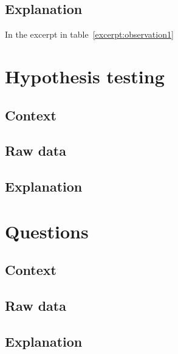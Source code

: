\subsection{Explanation}
In the excerpt in table~\ref{excerpt:observation1} 

\section{Hypothesis testing}

\subsection{Context}
\subsection{Raw data}
\subsection{Explanation}

\section{Questions}

\subsection{Context}
\subsection{Raw data}
\subsection{Explanation}